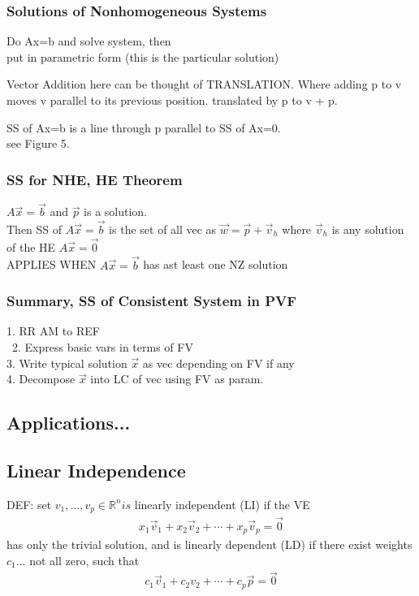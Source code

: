 \documentclass[12pt]{article}
\newcommand{\R}{\mathbb{R}}
\begin{document}
    \subsubsection{Solutions of Nonhomogeneous Systems}
        Do Ax=b and solve system, then \\
        put in parametric form (this is the particular solution)
        \par
        Vector Addition here can be thought of TRANSLATION. Where adding p
        to v moves v parallel to its previous position. translated by p
        to v + p.
        \par
        SS of Ax=b is a line through p parallel to SS of Ax=0. \\
        see Figure 5.
    \subsubsection{SS for NHE, HE Theorem}
        $ A\vec x = \vec b $  and $ \vec p $  is a solution. \\
        Then SS of $ A\vec x = \vec b $ is the set of all vec as
        $ \vec w = \vec p + \vec v_h $  where $ \vec v_h $  is
        any solution of the HE $ A\vec x = \vec 0 $  \\
        APPLIES WHEN $ A\vec x = \vec b $ has ast least one NZ solution  
    \subsubsection{Summary, SS of Consistent System in PVF}
        1. RR AM to REF \\\
        2. Express basic vars in terms of FV \\
        3. Write typical solution $ \vec x $  as vec depending on FV if any \\
        4. Decompose $ \vec x $  into LC of vec using FV as param. 
\subsection{Applications...}
\subsection{Linear Independence}
DEF: set $ v_{1},\dots,v_{p} \in\R^n is  $  linearly independent (LI) if the
VE
    \begin{align*}
        x_{1}\vec v_{1} +x_{2}\vec v_{2} + \cdots+ x_{p}\vec v_{p} = \vec 0
    \end{align*}
    has only the trivial solution, and is linearly dependent (LD) if
    there exist weights $ c_{1}... $  not all zero, such that
    \begin{align*}
        c_{1}\vec v_{1}+ c_{2}v_{2}+ \cdots+ c_{p}\vec p = \vec 0
    \end{align*}
\end{document}
